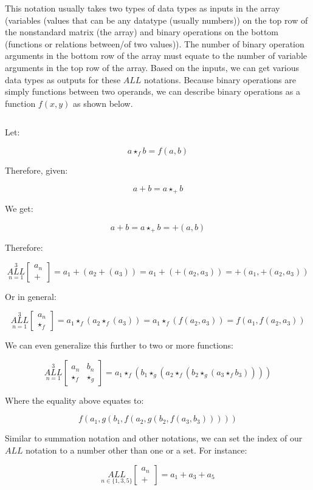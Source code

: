 \documentclass{article}
\begin{document}
This notation usually takes two types of data types as inputs in the array (variables (values that can be any datatype (usually numbers)) on the top row of the nonstandard matrix (the array) and binary operations on the bottom (functions or relations between/of two values)). The number of binary operation arguments in the bottom row of the array must equate to the number of variable arguments in the top row of the array. Based on the inputs, we can get various data types as outputs for these $ALL$ notations. Because binary operations are simply functions between two operands, we can describe binary operations as a function $f(x,y)$ as shown below.

$${}$$

Let:

$$a \star_f b = f(a,b)$$

Therefore, given:

$$a+b= a \star_+ b$$

We get:

$$a+b= a \star_+ b = +(a,b)$$

Therefore:

$$\underset{n=1}{\overset{3}{ALL}} \begin{bmatrix}
a_n \\
+
\end{bmatrix} = a_1+(a_2+(a_3)) = a_1+(+(a_2,a_3))=+(a_1,+(a_2,a_3))$$

Or in general:

$$\underset{n=1}{\overset{3}{ALL}} \begin{bmatrix}
a_n \\
\star_f
\end{bmatrix} = a_1\star_f(a_2\star_f(a_3)) = a_1\star_f(f(a_2,a_3))=f(a_1,f(a_2,a_3))$$

We can even generalize this further to two or more functions:

$$\underset{n=1}{\overset{3}{ALL}} \begin{bmatrix}
a_n & b_n\\
\star_f & \star_g
\end{bmatrix} = a_1 \star_f (b_1 \star_g (a_2  \star_f (b_2 \star_g (a_3 \star_f b_3))))$$

Where the equality above equates to:

$$f(a_1,g(b_1,f(a_2,g(b_2,f(a_3,b_3)))))$$

Similar to summation notation and other notations, we can set the index of our $ALL$ notation to a number other than one or a set. For instance:

$$\underset{n\in \{ 1, 3, 5 \}}{ALL} \begin{bmatrix}
a_n \\
+
\end{bmatrix} = a_1+a_3+a_5$$
\end{document}
